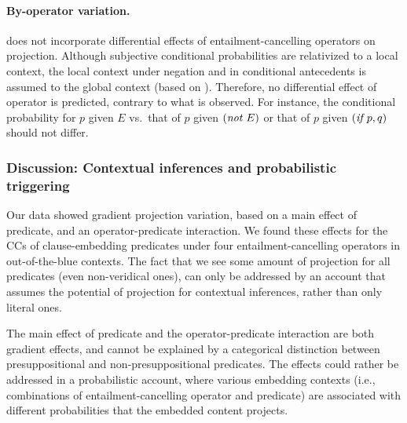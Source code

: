 \documentclass[a4paper,12pt,twoside]{article}
\begin{document}
\paragraph{By-operator variation.} \citealt{schlenker_triggering_2021} does not incorporate differential effects of entailment-cancelling operators on projection. Although subjective conditional probabilities are relativized to a local context, the local context under negation and in conditional antecedents is assumed to the global context (based on \citealt{heim_projection_1983,schlenker_local_2009}). Therefore, no differential effect of operator is predicted, contrary to what is observed. For instance, the conditional probability for $p$ given $E$ vs.\ that of $p$ given $(\emph{not } E)$ or that of $p$ given $(\emph{if } p, q)$ should not differ.



	\subsubsection{Discussion: Contextual inferences and probabilistic triggering}

		Our data showed gradient projection variation, based on a main effect of predicate, and an operator-predicate interaction. We found these effects for the CCs of clause-embedding predicates under four entailment-cancelling operators in out-of-the-blue contexts. The fact that we see some amount of projection for all predicates (even non-veridical ones), can only be addressed by an account that assumes the potential of projection for contextual inferences, rather than only literal ones.

		The main effect of predicate and the operator-predicate interaction are both gradient effects, and cannot be explained by a categorical distinction between presuppositional and non-pre\-suppo\-si\-tion\-al predicates. The effects could rather be addressed in a probabilistic account, where various embedding contexts (i.e., combinations of entailment-cancelling operator and predicate) are associated with different probabilities that the embedded content projects.
\end{document}

